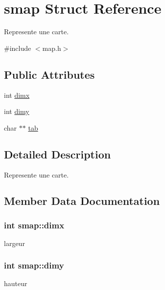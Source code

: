 \hypertarget{structsmap}{}\section{smap Struct Reference}
\label{structsmap}


Represente une carte.  




{\ttfamily \#include $<$map.\+h$>$}

\subsection*{Public Attributes}
\begin{DoxyCompactItemize}
\item 
int \hyperlink{structsmap_a24ad10f9debfa982dd6924a7e7de962d}{dimx}
\item 
int \hyperlink{structsmap_a39929dac09e4d7e99454c5fe4cc92a84}{dimy}
\item 
char $\ast$$\ast$ \hyperlink{structsmap_a464023235f8698b3df6a40b3f5a56d8d}{tab}
\end{DoxyCompactItemize}


\subsection{Detailed Description}
Represente une carte. 

\subsection{Member Data Documentation}
\subsubsection[{\texorpdfstring{dimx}{dimx}}]{\setlength{\rightskip}{0pt plus 5cm}int smap\+::dimx}\hypertarget{structsmap_a24ad10f9debfa982dd6924a7e7de962d}{}\label{structsmap_a24ad10f9debfa982dd6924a7e7de962d}
largeur 
\subsubsection[{\texorpdfstring{dimy}{dimy}}]{\setlength{\rightskip}{0pt plus 5cm}int smap\+::dimy}\hypertarget{structsmap_a39929dac09e4d7e99454c5fe4cc92a84}{}\label{structsmap_a39929dac09e4d7e99454c5fe4cc92a84}
hauteur 
